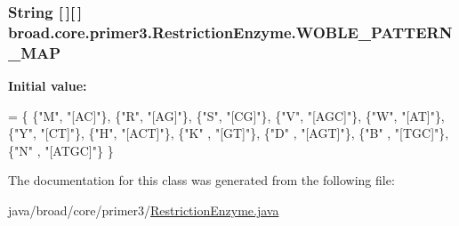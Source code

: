 \hypertarget{classbroad_1_1core_1_1primer3_1_1_restriction_enzyme_a14f30a2457ab294a1e543c6a9ec09c46}{
\subsubsection[{W\+O\+B\+L\+E\+\_\+\+P\+A\+T\+T\+E\+R\+N\+\_\+\+M\+A\+P}]{\setlength{\rightskip}{0pt plus 5cm}String \mbox{[}$\,$\mbox{]}\mbox{[}$\,$\mbox{]} broad.\+core.\+primer3.\+Restriction\+Enzyme.\+W\+O\+B\+L\+E\+\_\+\+P\+A\+T\+T\+E\+R\+N\+\_\+\+M\+A\+P\hspace{0.3cm}{\ttfamily [static]}}}\label{classbroad_1_1core_1_1primer3_1_1_restriction_enzyme_a14f30a2457ab294a1e543c6a9ec09c46}
{\bfseries Initial value\+:}
\begin{DoxyCode}
= \{
        \{\textcolor{stringliteral}{"M"},  \textcolor{stringliteral}{"[AC]"}\},
        \{\textcolor{stringliteral}{"R"},  \textcolor{stringliteral}{"[AG]"}\},
        \{\textcolor{stringliteral}{"S"},  \textcolor{stringliteral}{"[CG]"}\},
        \{\textcolor{stringliteral}{"V"},  \textcolor{stringliteral}{"[AGC]"}\},
        \{\textcolor{stringliteral}{"W"},  \textcolor{stringliteral}{"[AT]"}\},
        \{\textcolor{stringliteral}{"Y"},  \textcolor{stringliteral}{"[CT]"}\},
        \{\textcolor{stringliteral}{"H"},  \textcolor{stringliteral}{"[ACT]"}\},
        \{\textcolor{stringliteral}{"K"} , \textcolor{stringliteral}{"[GT]"}\},
        \{\textcolor{stringliteral}{"D"} , \textcolor{stringliteral}{"[AGT]"}\},
        \{\textcolor{stringliteral}{"B"} , \textcolor{stringliteral}{"[TGC]"}\},
        \{\textcolor{stringliteral}{"N"} , \textcolor{stringliteral}{"[ATGC]"}\}
    \}
\end{DoxyCode}


The documentation for this class was generated from the following file\+:\begin{DoxyCompactItemize}
\item 
java/broad/core/primer3/\hyperlink{_restriction_enzyme_8java}{Restriction\+Enzyme.\+java}\end{DoxyCompactItemize}
